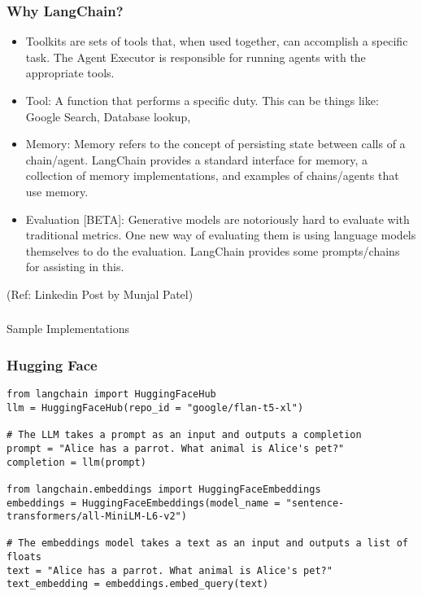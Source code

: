 \begin{frame}\frametitle{Why LangChain?}

\begin{itemize}
\item Toolkits are sets of tools that, when used together, can accomplish a specific task. The Agent Executor is responsible for running agents with the appropriate tools.
\item Tool: A function that performs a specific duty. This can be things like: Google Search, Database lookup,
\item Memory: Memory refers to the concept of persisting state between calls of a chain/agent. LangChain provides a standard interface for memory, a collection of memory implementations, and examples of chains/agents that use memory.
\item Evaluation [BETA]: Generative models are notoriously hard to evaluate with traditional metrics. One new way of evaluating them is using language models themselves to do the evaluation. LangChain provides some prompts/chains for assisting in this.
\end{itemize}

{\tiny (Ref: Linkedin Post by Munjal Patel)}
\end{frame}


\begin{frame}[fragile]\frametitle{}
\begin{center}
{\Large Sample Implementations}
\end{center}
\end{frame}

\begin{frame}[fragile]\frametitle{Hugging Face}

\begin{lstlisting}
from langchain import HuggingFaceHub
llm = HuggingFaceHub(repo_id = "google/flan-t5-xl")

# The LLM takes a prompt as an input and outputs a completion
prompt = "Alice has a parrot. What animal is Alice's pet?"
completion = llm(prompt)

from langchain.embeddings import HuggingFaceEmbeddings
embeddings = HuggingFaceEmbeddings(model_name = "sentence-transformers/all-MiniLM-L6-v2")

# The embeddings model takes a text as an input and outputs a list of floats
text = "Alice has a parrot. What animal is Alice's pet?"
text_embedding = embeddings.embed_query(text)


\end{lstlisting}


\end{frame}

